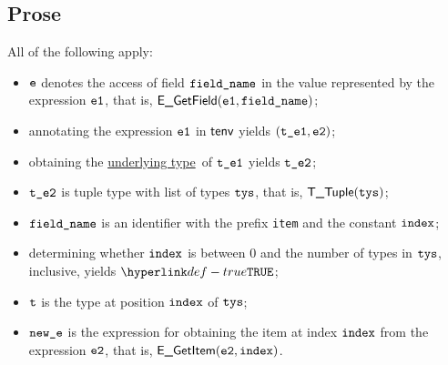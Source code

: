 \documentclass{book}
\newcommand\ProseOrTypeError[0]{\ProseTerminateAs{\TypeErrorConfig}}
\newcommand\underlyingtype[0]{\hyperlink{def-underlyingtype}{underlying type}}
\begin{document}
\subsection{Prose}
All of the following apply:
\begin{itemize}
  \item $\texttt{e}$ denotes the access of field $\texttt{field\_name}$ in the value represented by the expression $\texttt{e1}$, that is, $\textsf{E\_GetField}(\texttt{e1}, \texttt{field\_name})$;
  \item annotating the expression $\texttt{e1}$ in $\textsf{tenv}$ yields $(\texttt{t\_e1}, \texttt{e2})$\ProseOrTypeError;
  \item obtaining the \underlyingtype\ of $\texttt{t\_e1}$ yields $\texttt{t\_e2}$\ProseOrTypeError;
  \item $\texttt{t\_e2}$ is tuple type with list of types $\texttt{tys}$, that is, $\textsf{T\_Tuple}(\texttt{tys})$;
  \item $\texttt{field\_name}$ is an identifier with the prefix \texttt{item} and the constant $\texttt{index}$;
  \item determining whether $\texttt{index}$ is between $0$ and the number of types in $\texttt{tys}$, inclusive, yields $\True$\ProseOrTypeError;
  \item $\texttt{t}$ is the type at position $\texttt{index}$ of $\texttt{tys}$;
  \item $\texttt{new\_e}$ is the expression for obtaining the item at index $\texttt{index}$ from the expression $\texttt{e2}$, that is, $\textsf{E\_GetItem}(\texttt{e2}, \texttt{index})$.
\end{itemize}


\end{document}
